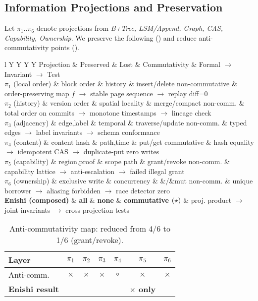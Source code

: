 \documentclass[10pt]{article}
\begin{document}
\subsection{Information Projections and Preservation}
Let $\pi_1.. \pi_6$ denote projections from \emph{B+Tree, LSM/Append, Graph, CAS, Capability, Ownership}.
We preserve the following () and reduce anti-commutativity points ().

\begin{table}[h]
\centering
\small
\begin{tabularx}{\linewidth}{l Y Y Y Y}
\toprule
Projection & Preserved & Lost & Commutativity & Formal $\to$ Invariant $\to$ Test \\
\midrule
$\pi_1$ (local order) & block order & history & insert/delete non-commutative & order-preserving map $f$ $\to$ stable page sequence $\to$ replay diff=0 \\
$\pi_2$ (history) & version order & spatial locality & merge/compact non-comm. & total order on commits $\to$ monotone timestamps $\to$ lineage check \\
$\pi_3$ (adjacency) & edge,label & temporal & traverse/update non-comm. & typed edges $\to$ label invariants $\to$ schema conformance \\
$\pi_4$ (content) & content hash & path,time & put/get commutative & hash equality $\to$ idempotent CAS $\to$ duplicate-put zero writes \\
$\pi_5$ (capability) & region,proof & scope path & grant/revoke non-comm. & capability lattice $\to$ anti-escalation $\to$ failed illegal grant \\
$\pi_6$ (ownership) & exclusive write & concurrency & \&/\&mut non-comm. & unique borrower $\to$ aliasing forbidden $\to$ race detector zero \\
\textbf{Enishi (composed)} & \textbf{all} & \textbf{none} & \textbf{commutative $\small(\star)$} & proj. product $\to$ joint invariants $\to$ cross-projection tests \\
\bottomrule
\end{tabularx}
\caption{Preservation laws across projections. $(\star)$ except capability revocation boundary.}
\label{tab:preserve}
\end{table}

\begin{table}[h]
\centering
\small
\begin{tabular}{l c c c c c c}
\toprule
Layer & $\pi_1$ & $\pi_2$ & $\pi_3$ & $\pi_4$ & $\pi_5$ & $\pi_6$ \\
\midrule
Anti-comm. & $\times$ & $\times$ & $\times$ & $\circ$ & $\times$ & $\times$ \\
\textbf{Enishi result} &  &  &  &  & \textbf{$\times$ only} &  \\
\bottomrule
\end{tabular}
\caption{Anti-commutativity map: reduced from 4/6 to 1/6 (grant/revoke).}
\label{tab:anti}
\end{table}
\end{document}
